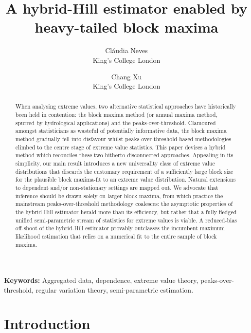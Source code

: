 \documentclass[11pt, a4paper, oneside]{article}
\title{A hybrid-Hill estimator enabled by heavy-tailed block maxima}
\author{Cl\'{a}udia Neves \\  
 {\small King's College London}\\ 
  \and {Chang Xu}\\ {\small King's College London}
}
\date{}
\numberwithin{equation}{section}
\theoremstyle{plain}
\theoremstyle{definition}
\begin{document}
\maketitle



\begin{abstract}
When analysing extreme values, two alternative statistical approaches have historically been held in contention: the block maxima method (or annual maxima method, spurred by hydrological applications) and the peaks-over-threshold.
Clamoured amongst statisticians as wasteful of potentially informative data, the block maxima method gradually fell into disfavour whilst peaks-over-threshold-based methodologies climbed to the centre stage of extreme value statistics.
This paper devises a hybrid method which reconciles these two hitherto disconnected approaches. Appealing in its simplicity, our main result introduces a new universality class of extreme value distributions that discards the customary requirement of a sufficiently large block size for the plausible block maxima-fit to an extreme value distribution. Natural extensions to dependent and/or non-stationary settings are mapped out. We advocate that inference should be drawn solely on larger block maxima, from which practice the mainstream peaks-over-threshold methodology coalesces: the asymptotic properties of the hybrid-Hill estimator herald more than its efficiency, but rather that a fully-fledged unified semi-parametric stream of statistics for extreme values is viable. A reduced-bias off-shoot of the hybrid-Hill estimator provably outclasses the incumbent maximum likelihood estimation that relies on a numerical fit to the entire sample of block maxima.
\end{abstract}


\textbf{Keywords:}
Aggregated data, dependence, extreme value theory, peaks-over-threshold, regular variation theory, semi-parametric estimation.

\section{Introduction}
\end{document}
